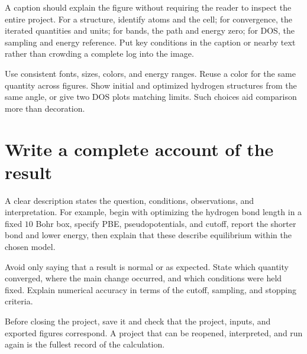 A caption should explain the figure without requiring the reader to inspect the entire project. For a structure, identify atoms and the cell; for convergence, the iterated quantities and units; for bands, the path and energy zero; for DOS, the sampling and energy reference. Put key conditions in the caption or nearby text rather than crowding a complete log into the image.

Use consistent fonts, sizes, colors, and energy ranges. Reuse a color for the same quantity across figures. Show initial and optimized hydrogen structures from the same angle, or give two DOS plots matching limits. Such choices aid comparison more than decoration.

\section{Write a complete account of the result}

A clear description states the question, conditions, observations, and interpretation. For example, begin with optimizing the hydrogen bond length in a fixed $10$ Bohr box, specify PBE, pseudopotentials, and cutoff, report the shorter bond and lower energy, then explain that these describe equilibrium within the chosen model.

Avoid only saying that a result is normal or as expected. State which quantity converged, where the main change occurred, and which conditions were held fixed. Explain numerical accuracy in terms of the cutoff, sampling, and stopping criteria.

Before closing the project, save it and check that the project, inputs, and exported figures correspond. A project that can be reopened, interpreted, and run again is the fullest record of the calculation.
